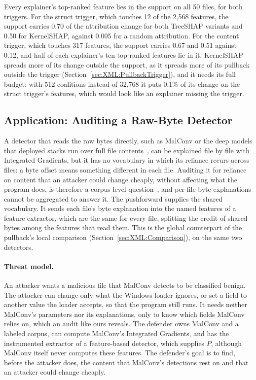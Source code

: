 Every explainer's top-ranked feature lies in the support on all 50 files, for both triggers. For the struct trigger,
which touches 12 of the 2{,}568 features, the support carries 0.70 of the attribution change for both TreeSHAP variants
and 0.50 for KernelSHAP, against 0.005 for a random attribution. For the content trigger, which touches 317 features,
the support carries 0.67 and 0.51 against 0.12, and half of each explainer's ten top-ranked features lie in it.
KernelSHAP spreads more of its change outside the support, as it spreads more of its pullback outside the trigger
(Section~\ref{sec:XML:PullbackTrigger}), and it needs its full budget: with 512 coalitions instead of 32{,}768 it puts
0.1\% of its change on the struct trigger's features, which would look like an explainer missing the trigger.

\subsection{Application: Auditing a Raw-Byte Detector}
\label{sec:XML:Audit}

A detector that reads the raw bytes directly, such as MalConv or the deep models that deployed stacks run over full
file contents~\cite{microsoft2019insideout}, can be explained file by file with Integrated Gradients, but it has no
vocabulary in which its reliance recurs across files: a byte offset means something different in each file. Auditing it
for reliance on content that an attacker could change cheaply, without affecting what the program does, is therefore a
corpus-level question~\cite{arp2022and}, and per-file byte explanations cannot be aggregated to answer it. The
pushforward supplies the shared vocabulary. It sends each file's byte explanation into the named features of a feature
extractor, which are the same for every file, splitting the credit of shared bytes among the features that read them.
This is the global counterpart of the pullback's local comparison (Section~\ref{sec:XML:Comparison}), on the same two
detectors.

\paragraph{Threat model.} An attacker wants a malicious file that MalConv detects to be classified benign. The attacker
can change only what the Windows loader ignores, or set a field to another value the loader accepts, so that the
program still runs. It needs neither MalConv's parameters nor its explanations, only to know which fields MalConv
relies on, which an audit like ours reveals. The defender owns MalConv and a labeled corpus, can compute MalConv's
Integrated Gradients, and has the instrumented extractor of a feature-based detector, which supplies $P$, although
MalConv itself never computes these features. The defender's goal is to find, before the attacker does, the content
that MalConv's detections rest on and that an attacker could change cheaply.

